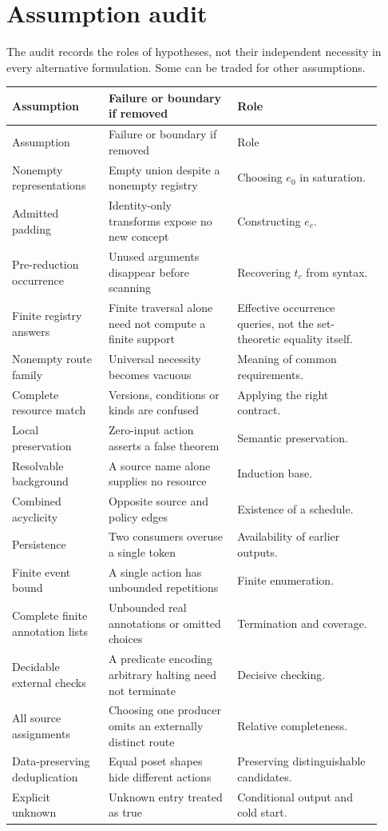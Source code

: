 \documentclass[11pt,a4paper]{article}
\theoremstyle{remark}
\begin{document}
\section{Assumption audit}\label{app:assumptions}
The audit records the roles of hypotheses, not their independent necessity
in every alternative formulation. Some can be traded for other assumptions.
\begin{longtable}{@{}>{\raggedright\arraybackslash}p{0.24\linewidth}>{\raggedright\arraybackslash}p{0.32\linewidth}>{\raggedright\arraybackslash}p{0.36\linewidth}@{}}
\toprule Assumption & Failure or boundary if removed & Role\\\midrule\endfirsthead
\toprule Assumption & Failure or boundary if removed & Role\\\midrule\endhead
Nonempty representations & Empty union despite a nonempty registry &
Choosing \(e_0\) in saturation.\\
Admitted padding & Identity-only transforms expose no new concept &
Constructing \(e_c\).\\
Pre-reduction occurrence & Unused arguments disappear before scanning &
Recovering \(t_c\) from syntax.\\
Finite registry answers & Finite traversal alone need not compute a finite support &
Effective occurrence queries, not the set-theoretic equality itself.\\
Nonempty route family & Universal necessity becomes vacuous &
Meaning of common requirements.\\
Complete resource match & Versions, conditions or kinds are confused &
Applying the right contract.\\
Local preservation & Zero-input action asserts a false theorem &
Semantic preservation.\\
Resolvable background & A source name alone supplies no resource &
Induction base.\\
Combined acyclicity & Opposite source and policy edges &
Existence of a schedule.\\
Persistence & Two consumers overuse a single token &
Availability of earlier outputs.\\
Finite event bound & A single action has unbounded repetitions &
Finite enumeration.\\
Complete finite annotation lists & Unbounded real annotations or omitted choices &
Termination and coverage.\\
Decidable external checks & A predicate encoding arbitrary halting need not terminate &
Decisive checking.\\
All source assignments & Choosing one producer omits an externally distinct route &
Relative completeness.\\
Data-preserving deduplication & Equal poset shapes hide different actions &
Preserving distinguishable candidates.\\
Explicit unknown & Unknown entry treated as true &
Conditional output and cold start.\\
\bottomrule
\end{longtable}


\end{document}
